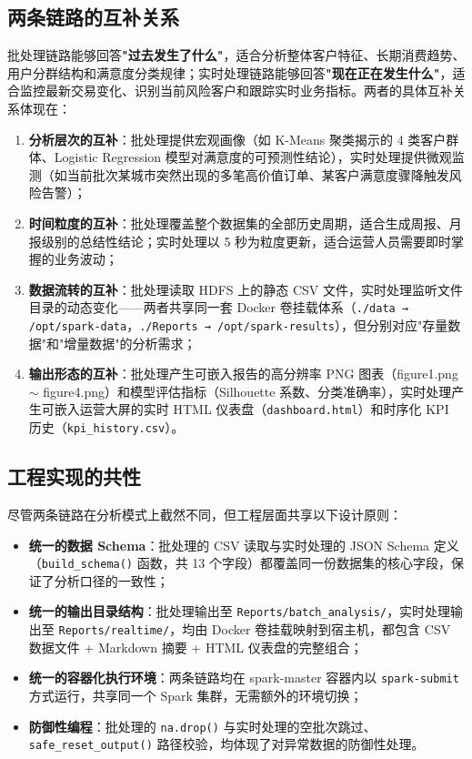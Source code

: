\documentclass[12pt,hyperref,a4paper,UTF8]{ctexart}
\begin{document}
\subsection{两条链路的互补关系}

批处理链路能够回答\textbf{"过去发生了什么"}，适合分析整体客户特征、长期消费趋势、用户分群结构和满意度分类规律；实时处理链路能够回答\textbf{"现在正在发生什么"}，适合监控最新交易变化、识别当前风险客户和跟踪实时业务指标。两者的具体互补关系体现在：

\begin{enumerate}
    \item \textbf{分析层次的互补}：批处理提供宏观画像（如 K-Means 聚类揭示的 4 类客户群体、Logistic Regression 模型对满意度的可预测性结论），实时处理提供微观监测（如当前批次某城市突然出现的多笔高价值订单、某客户满意度骤降触发风险告警）；
    \item \textbf{时间粒度的互补}：批处理覆盖整个数据集的全部历史周期，适合生成周报、月报级别的总结性结论；实时处理以 5 秒为粒度更新，适合运营人员需要即时掌握的业务波动；
    \item \textbf{数据流转的互补}：批处理读取 HDFS 上的静态 CSV 文件，实时处理监听文件目录的动态变化——两者共享同一套 Docker 卷挂载体系（\texttt{./data → /opt/spark-data}，\texttt{./Reports → /opt/spark-results}），但分别对应"存量数据"和"增量数据"的分析需求；
    \item \textbf{输出形态的互补}：批处理产生可嵌入报告的高分辨率 PNG 图表（figure1.png $\sim$ figure4.png）和模型评估指标（Silhouette 系数、分类准确率），实时处理产生可嵌入运营大屏的实时 HTML 仪表盘（\texttt{dashboard.html}）和时序化 KPI 历史（\texttt{kpi\_history.csv}）。
\end{enumerate}

\subsection{工程实现的共性}

尽管两条链路在分析模式上截然不同，但工程层面共享以下设计原则：

\begin{itemize}
    \item \textbf{统一的数据 Schema}：批处理的 CSV 读取与实时处理的 JSON Schema 定义（\texttt{build\_schema()} 函数，共 13 个字段）都覆盖同一份数据集的核心字段，保证了分析口径的一致性；
    \item \textbf{统一的输出目录结构}：批处理输出至 \texttt{Reports/batch\_analysis/}，实时处理输出至 \texttt{Reports/realtime/}，均由 Docker 卷挂载映射到宿主机，都包含 CSV 数据文件 + Markdown 摘要 + HTML 仪表盘的完整组合；
    \item \textbf{统一的容器化执行环境}：两条链路均在 spark-master 容器内以 \texttt{spark-submit} 方式运行，共享同一个 Spark 集群，无需额外的环境切换；
    \item \textbf{防御性编程}：批处理的 \texttt{na.drop()} 与实时处理的空批次跳过、\texttt{safe\_reset\_output()} 路径校验，均体现了对异常数据的防御性处理。
\end{itemize}
\end{document}
